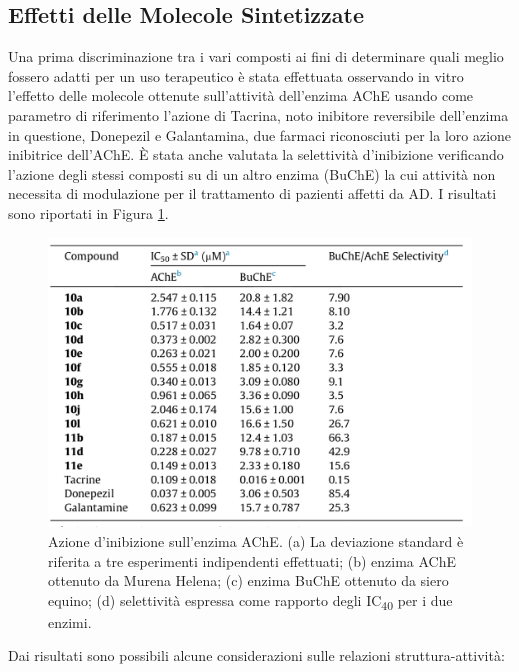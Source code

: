 \documentclass[a4paper, 12pt]{article}
\begin{document}
\subsection{Effetti delle Molecole Sintetizzate}
Una prima discriminazione tra i vari composti ai fini di determinare quali meglio fossero adatti per un uso terapeutico è stata effettuata osservando in vitro l'effetto delle molecole ottenute sull'attività dell'enzima AChE usando come parametro di riferimento l'azione di Tacrina, noto inibitore reversibile dell'enzima in questione, Donepezil e Galantamina, due farmaci riconosciuti per la loro azione inibitrice dell'AChE. È stata anche valutata la selettività d'inibizione verificando l'azione degli stessi composti su di un altro enzima (BuChE) la cui attività non necessita di modulazione per il trattamento di pazienti affetti da AD. I risultati sono riportati in Figura \ref{fig:tabellacomposti_curcdone}.

\begin{figure}[H]
	\centering
	\includegraphics[width=.8\linewidth]{immagini/tabellacomposti_curcdone.png}
	\caption{Azione d'inibizione sull'enzima AChE. (a) La deviazione standard è riferita a tre esperimenti indipendenti effettuati; (b) enzima AChE ottenuto da Murena Helena; (c) enzima BuChE ottenuto da siero equino; (d) selettività espressa come rapporto degli IC\textsubscript{40} per i due enzimi.}
	\label{fig:tabellacomposti_curcdone}
\end{figure}

Dai risultati sono possibili alcune considerazioni sulle relazioni struttura-attività:
\end{document}
